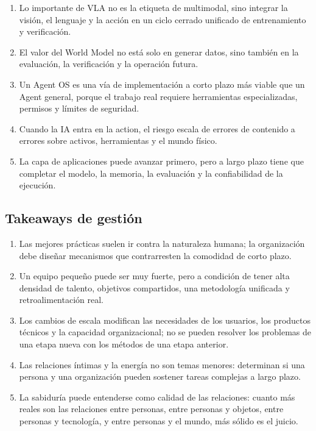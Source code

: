 \begin{enumerate}
\item Lo importante de VLA no es la etiqueta de multimodal, sino integrar la visión, el lenguaje y la acción en un ciclo cerrado unificado de entrenamiento y verificación.
\item El valor del World Model no está solo en generar datos, sino también en la evaluación, la verificación y la operación futura.
\item Un Agent OS es una vía de implementación a corto plazo más viable que un Agent general, porque el trabajo real requiere herramientas especializadas, permisos y límites de seguridad.
\item Cuando la IA entra en la action, el riesgo escala de errores de contenido a errores sobre activos, herramientas y el mundo físico.
\item La capa de aplicaciones puede avanzar primero, pero a largo plazo tiene que completar el modelo, la memoria, la evaluación y la confiabilidad de la ejecución.
\end{enumerate}

\subsection{Takeaways de gestión}

\begin{enumerate}
\item Las mejores prácticas suelen ir contra la naturaleza humana; la organización debe diseñar mecanismos que contrarresten la comodidad de corto plazo.
\item Un equipo pequeño puede ser muy fuerte, pero a condición de tener alta densidad de talento, objetivos compartidos, una metodología unificada y retroalimentación real.
\item Los cambios de escala modifican las necesidades de los usuarios, los productos técnicos y la capacidad organizacional; no se pueden resolver los problemas de una etapa nueva con los métodos de una etapa anterior.
\item Las relaciones íntimas y la energía no son temas menores: determinan si una persona y una organización pueden sostener tareas complejas a largo plazo.
\item La sabiduría puede entenderse como calidad de las relaciones: cuanto más reales son las relaciones entre personas, entre personas y objetos, entre personas y tecnología, y entre personas y el mundo, más sólido es el juicio.
\end{enumerate}

